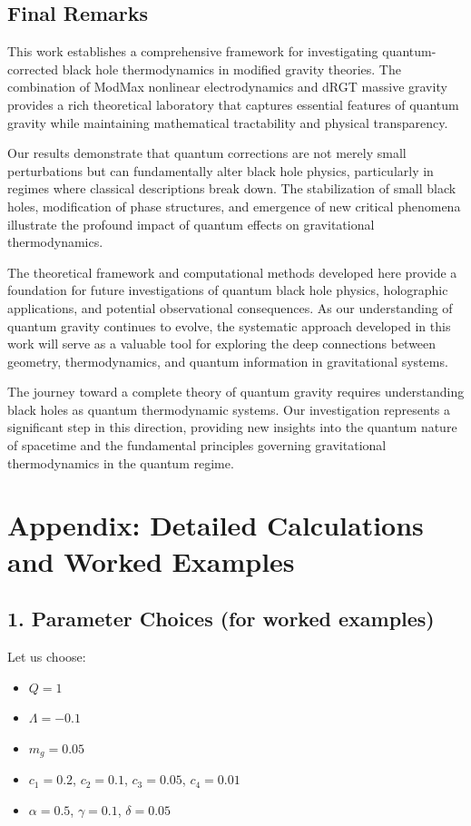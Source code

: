 \documentclass[12pt]{article}
\begin{document}
\subsection{Final Remarks}

This work establishes a comprehensive framework for investigating quantum-corrected black hole thermodynamics in modified gravity theories. The combination of ModMax nonlinear electrodynamics and dRGT massive gravity provides a rich theoretical laboratory that captures essential features of quantum gravity while maintaining mathematical tractability and physical transparency.

Our results demonstrate that quantum corrections are not merely small perturbations but can fundamentally alter black hole physics, particularly in regimes where classical descriptions break down. The stabilization of small black holes, modification of phase structures, and emergence of new critical phenomena illustrate the profound impact of quantum effects on gravitational thermodynamics.

The theoretical framework and computational methods developed here provide a foundation for future investigations of quantum black hole physics, holographic applications, and potential observational consequences. As our understanding of quantum gravity continues to evolve, the systematic approach developed in this work will serve as a valuable tool for exploring the deep connections between geometry, thermodynamics, and quantum information in gravitational systems.

The journey toward a complete theory of quantum gravity requires understanding black holes as quantum thermodynamic systems. Our investigation represents a significant step in this direction, providing new insights into the quantum nature of spacetime and the fundamental principles governing gravitational thermodynamics in the quantum regime.

\appendix
\section*{Appendix: Detailed Calculations and Worked Examples}
\subsection*{1. Parameter Choices (for worked examples)}
Let us choose:
\begin{itemize}
    \item $Q = 1$
    \item $\Lambda = -0.1$
    \item $m_g = 0.05$
    \item $c_1 = 0.2$, $c_2 = 0.1$, $c_3 = 0.05$, $c_4 = 0.01$
    \item $\alpha = 0.5$, $\gamma = 0.1$, $\delta = 0.05$
\end{itemize}
\end{document}
